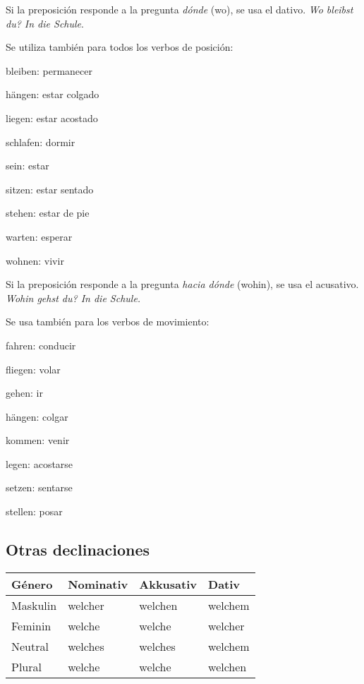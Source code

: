 Si la preposición responde a la pregunta \textit{dónde} (wo), se usa el dativo. \textit{Wo bleibst du? In die Schule}. 

Se utiliza también para todos los verbos de posición:
\begin{multicols}{3}
\begin{myitemize}
\item bleiben: permanecer
\item hängen: estar colgado
\item liegen: estar acostado
\item schlafen: dormir
\item sein: estar
\item sitzen: estar sentado
\item stehen: estar de pie
\item warten: esperar
\item wohnen: vivir
\end{myitemize}
\end{multicols}

Si la preposición responde a la pregunta \textit{hacia dónde} (wohin), se usa el acusativo. \textit{Wohin gehst du? In die Schule.} 

Se usa también para los verbos de movimiento:
\begin{multicols}{3}
\begin{myitemize}
\item fahren: conducir
\item fliegen: volar
\item gehen: ir
\item hängen: colgar
\item kommen: venir
\item legen: acostarse
\item setzen: sentarse
\item stellen: posar
\end{myitemize}
\end{multicols}

\subsection{Otras declinaciones}
\begin{tabular}{| l | l | l | l |}
\hline
\textbf{Género} & \textbf{Nominativ} & \textbf{Akkusativ} & \textbf{Dativ}\\
\hline
Maskulin & welcher & welchen & welchem  \\
Feminin  & welche  &  welche & welcher \\
Neutral  & welches & welches & welchem \\
Plural   & welche  & welche  & welchen \\
\hline
\end{tabular}

